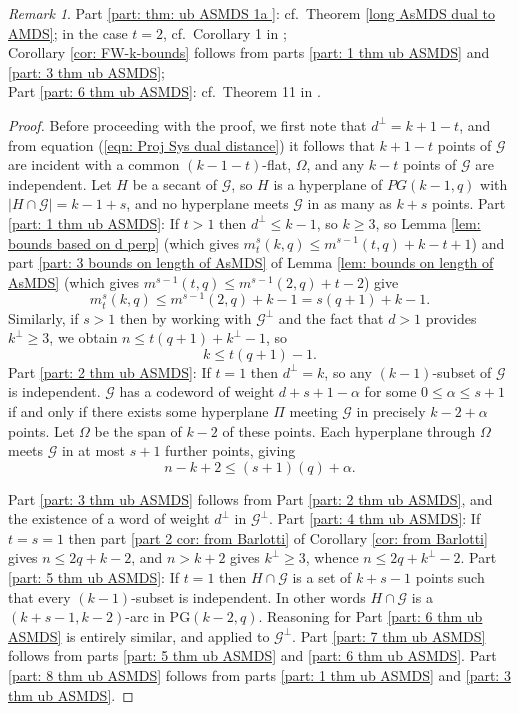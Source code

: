 \documentclass[11pt,a4paper]{amsart}
\newcommand{\G}{\mathcal{G}}
\theoremstyle{plain}
\theoremstyle{definition}
\theoremstyle{remark}
\newtheorem{remark}[theorem]{Remark}
\begin{document}
	\begin{remark}
		Part \ref{part: thm: ub ASMDS 1a }: cf.\ Theorem \ref{long AsMDS dual to AMDS}; in the case $t=2$, cf.\ Corollary 1 in \cite{Tong2012};\\
		Corollary \ref {cor: FW-k-bounds} follows from parts \ref{part: 1 thm ub ASMDS} and \ref{part: 3 thm ub ASMDS};\\
		Part \ref{part: 6 thm ub ASMDS}: cf.\ Theorem 11 in \cite{MR1409442}.
	\end{remark}
	\begin{proof}
		Before proceeding with the proof, we first note that $d^\perp = k+1-t$, and from equation (\ref{eqn: Proj Sys dual distance}) it follows that  $k+1-t$ points of $\G$ are incident with a common $(k-1-t)$-flat, $\Omega$,  and any $k-t$ points of $\G$ are  independent.
		Let $H$ be a secant of $\G$, so $H$ is a hyperplane of $PG(k-1,q)$ with $|H\cap \G|= k-1+s$, and no hyperplane meets $\G$ in as many as $k+s$ points.
		Part \ref{part: 1 thm ub ASMDS}: If $t>1$ then $d^\perp\le k-1$, so $k\ge 3$, so Lemma \ref{lem: bounds based on d perp} (which gives $m^s_t(k,q)\le m^{s-1}(t,q)+k-t+1$) and part \ref{part: 3 bounds on length of AsMDS} of Lemma \ref{lem: bounds on length of AsMDS} (which gives $m^{s-1}(t,q)\le m^{s-1}(2,q)+t-2$) give
		\[
		m^s_t(k,q)\le m^{s-1}(2,q)+k -1 = s(q+1)+k-1.
		\]
		Similarly, if $s>1$ then by working with $\G^\perp$ and the fact that $d>1$ provides $k^\perp\ge 3$,  we obtain $n\le t(q+1)+k^\perp -1$, so
		\begin{equation*} \label{eqn: max length ASMDS t}
			k\le t(q+1)-1.
		\end{equation*}
		Part \ref{part: 2 thm ub ASMDS}: If $t=1$ then $d^\perp=k$, so any $ (k-1)$-subset of $\G$ is  independent. $\G$ has a codeword of weight $d+s+1-\alpha$ for some $0\le \alpha\le s+1$ if and only if there exists some hyperplane $\Pi$ meeting $\G$ in precisely $k-2+\alpha$ points. Let $\Omega$ be the span of $ k-2 $ of these points.  Each hyperplane through $\Omega$ meets $\G$ in at most $s+1$ further points, giving
		\begin{equation} \label{eqn: bound on wt spectrum}
			n-k+2\le (s+1)(q) + \alpha.
		\end{equation}

		Part \ref{part: 3 thm ub ASMDS} follows from Part \ref{part: 2 thm ub ASMDS}, and the existence of a word of weight $d^\perp$ in $\G^\perp$.
		Part \ref{part: 4 thm ub ASMDS}: If $t=s=1$ then part \ref{part 2 cor: from Barlotti} of Corollary \ref{cor: from Barlotti} gives $n\le 2q+k-2$, and $n> k+2$ gives $k^\perp \ge 3$, whence $n\le 2q+k^\perp-2$.
		Part \ref{part: 5 thm ub ASMDS}: If $t=1$  then $H\cap \G$ is a set of  $k+s-1$ points such that every $(k-1)$-subset is  independent. In other words $H\cap \G$ is a $(k+s-1, k-2)$-arc in PG$(k-2,q)$.   Reasoning for Part \ref{part: 6 thm ub ASMDS}  is entirely similar, and applied to $\G^\perp$. Part \ref{part: 7 thm ub ASMDS} follows from parts \ref{part: 5 thm ub ASMDS} and \ref{part: 6 thm ub ASMDS}.
		Part \ref{part: 8 thm ub ASMDS} follows from parts \ref{part: 1 thm ub ASMDS} and \ref{part: 3 thm ub ASMDS}.
	\end{proof}
\end{document}
